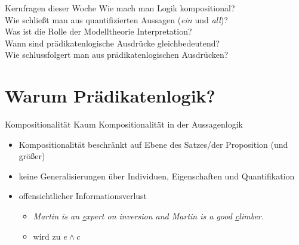 \begin{frame}
  {Kernfragen dieser Woche}
  \onslide<+->
  \onslide<+->
  \Large
  \centering 
  Wie mach man Logik \alert{kompositional}?\\
  \onslide<+->
  \Halbzeile
  Wie schließt man aus quantifizierten Aussagen (\textit{ein} und \textit{all})?\\
  \onslide<+->
  \Halbzeile
  Was ist die Rolle der \alert{Modelltheorie} Interpretation?\\
  \onslide<+->
  \Halbzeile
  Wann sind prädikatenlogische Ausdrücke \alert{gleichbedeutend}?\\
  \onslide<+->
  \Halbzeile
  Wie \alert{schlussfolgert} man aus prädikatenlogischen Ausdrücken?\\
  \onslide<+->
  \Halbzeile
\end{frame}

\section{Warum Prädikatenlogik?}

\begin{frame}
  {Kompositionalität}
  \onslide<+->
  \onslide<+->
  Kaum Kompositionalität in der Aussagenlogik\\
  \Halbzeile
  \begin{itemize}[<+->]
    \item Kompositionalität beschränkt auf Ebene des \alert{Satzes\slash der Proposition} (und größer)
    \item keine Generalisierungen über \alert{Individuen}, \alert{Eigenschaften} und \alert{Quantifikation}
    \item offensichtlicher Informationsverlust
      \begin{itemize}[<+->]
        \item \textit{Martin is an \underline{e}xpert on inversion and Martin is a good \underline{c}limber.}
        \item wird zu $e\wedge c$
      \end{itemize}
  \end{itemize}
\end{frame}

